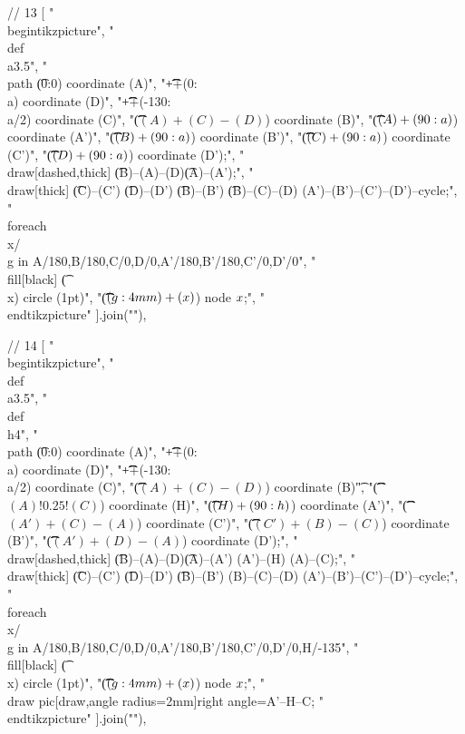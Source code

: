 // 13
[
"\\begin{tikzpicture}",
"\t\\def\\a{3.5}",
"\t\\path \t(0:0) coordinate (A)",
"\t\t\t++(0:\\a) coordinate (D)",
"\t\t\t++(-130:\\a/2) coordinate (C)",
"\t\t\t($(A)+(C)-(D)$) coordinate (B)",
"\t\t\t($(A)+(90:\\a)$) coordinate (A')",
"\t\t\t($(B)+(90:\\a)$) coordinate (B')",
"\t\t\t($(C)+(90:\\a)$) coordinate (C')",
"\t\t\t($(D)+(90:\\a)$) coordinate (D');",
"\t\\draw[dashed,thick] \t(B)--(A)--(D)\t(A)--(A');",
"\t\\draw[thick] \t(C)--(C') \t(D)--(D') \t(B)--(B') \t(B)--(C)--(D) (A')--(B')--(C')--(D')--cycle;",
"\t\\foreach \\x/\\g in {A/180,B/180,C/0,D/0,A'/180,B'/180,C'/0,D'/0}",
"\t\t\t\\fill[black] \t(\\x) circle (1pt)",
"\t\t\t($(\\g:4mm)+(\\x)$) node {$\\x$};",
"\\end{tikzpicture}"
].join("\n"),

// 14
[
"\\begin{tikzpicture}",
"\t\\def\\a{3.5}",
"\t\\def\\h{4}",
"\t\\path \t(0:0) coordinate (A)",
"\t\t\t++(0:\\a) coordinate (D)",
"\t\t\t++(-130:\\a/2) coordinate (C)",
"\t\t\t($(A)+(C)-(D)$) coordinate (B)\t",
"\t\t\t($(A)!0.25!(C)$) coordinate (H)",
"\t\t\t($(H)+(90:\\h)$) coordinate (A')",
"\t\t\t($(A')+(C)-(A)$) coordinate (C')",
"\t\t\t($(C')+(B)-(C)$) coordinate (B')",
"\t\t\t($(A')+(D)-(A)$) coordinate (D');",
"\t\\draw[dashed,thick] \t(B)--(A)--(D)\t(A)--(A') (A')--(H) (A)--(C);",
"\t\\draw[thick] \t(C)--(C') \t(D)--(D') \t(B)--(B')  (B)--(C)--(D) (A')--(B')--(C')--(D')--cycle;",
"\t\\foreach \\x/\\g in {A/180,B/180,C/0,D/0,A'/180,B'/180,C'/0,D'/0,H/-135}",
"\t\t\t\\fill[black] \t(\\x) circle (1pt)",
"\t\t\t($(\\g:4mm)+(\\x)$) node {$\\x$};",
"\t\\draw pic[draw,angle radius=2mm]{right angle=A'--H--C};%
"\\end{tikzpicture}"
].join("\n"),

